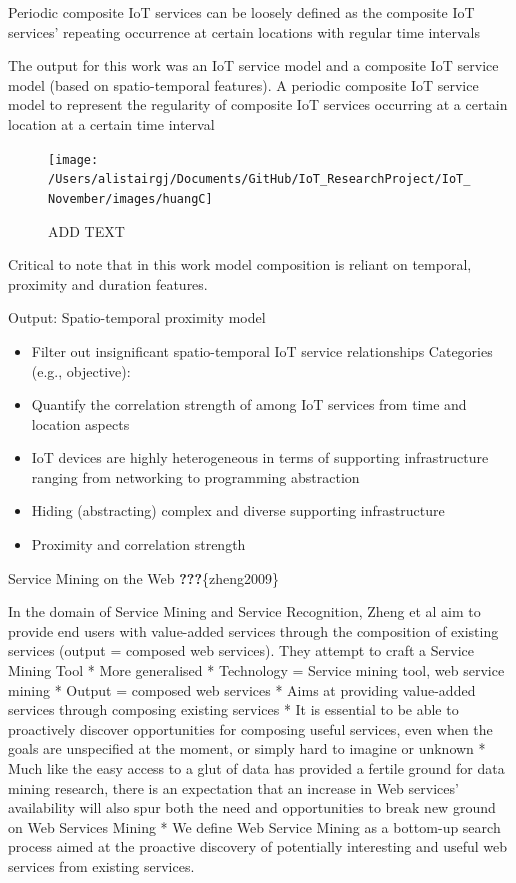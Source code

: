 \documentclass[11pt,]{article}
\providecommand{\tightlist}{%
  \setlength{\itemsep}{0pt}\setlength{\parskip}{0pt}}
\begin{document}
Periodic composite IoT services can be loosely defined as the composite
IoT services' repeating occurrence at certain locations with regular
time intervals

The output for this work was an IoT service model and a composite IoT
service model (based on spatio-temporal features). A periodic composite
IoT service model to represent the regularity of composite IoT services
occurring at a certain location at a certain time interval

\begin{figure}[H]

{\centering \texttt{[image: /Users/alistairgj/Documents/GitHub/IoT\_ResearchProject/IoT\_November/images/huangC]} 

}

\caption{ADD TEXT}\label{fig:unnamed-chunk-11}
\end{figure}

Critical to note that in this work model composition is reliant on
temporal, proximity and duration features.

Output: Spatio-temporal proximity model

\begin{itemize}
\tightlist
\item
  Filter out insignificant spatio-temporal IoT service relationships
  Categories (e.g., objective):
\item
  Quantify the correlation strength of among IoT services from time and
  location aspects
\item
  IoT devices are highly heterogeneous in terms of supporting
  infrastructure ranging from networking to programming abstraction
\item
  Hiding (abstracting) complex and diverse supporting infrastructure
\item
  Proximity and correlation strength
\end{itemize}

Service Mining on the Web \textbf{???}\{zheng2009\}

In the domain of Service Mining and Service Recognition, Zheng et al aim
to provide end users with value-added services through the composition
of existing services (output = composed web services). They attempt to
craft a Service Mining Tool * More generalised * Technology = Service
mining tool, web service mining * Output = composed web services * Aims
at providing value-added services through composing existing services *
It is essential to be able to proactively discover opportunities for
composing useful services, even when the goals are unspecified at the
moment, or simply hard to imagine or unknown * Much like the easy access
to a glut of data has provided a fertile ground for data mining
research, there is an expectation that an increase in Web services'
availability will also spur both the need and opportunities to break new
ground on Web Services Mining * We define Web Service Mining as a
bottom-up search process aimed at the proactive discovery of potentially
interesting and useful web services from existing services.
\end{document}
